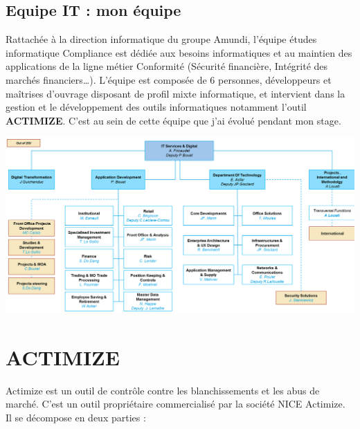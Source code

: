 \documentclass[12pt,a4paper]{report}
\begin{document}
\subsection{Equipe IT : mon équipe}
Rattachée à la direction informatique du groupe Amundi, l’équipe études informatique Compliance est dédiée aux besoins informatiques et au maintien des applications de la ligne métier Conformité (Sécurité financière, Intégrité des marchés financiers…).\vspace{0.3cm} \newline
L’équipe est composée de 6 personnes, développeurs et maîtrises d’ouvrage disposant de profil mixte informatique, et intervient dans la gestion et le développement  des outils informatiques notamment l'outil \textbf{ACTIMIZE}.
C’est au sein de cette équipe que j’ai évolué pendant mon stage.\vspace{0.9cm}  \newline 
\begin{center}
\includegraphics[scale=0.7]{IMG/it.png}
\end{center}

\newpage
\section{\textbf{ACTIMIZE}}
Actimize est un outil de contrôle contre les blanchissements et les abus de marché. C'est un outil propriétaire commercialisé par la société NICE Actimize. Il se décompose en deux parties :
\end{document}
